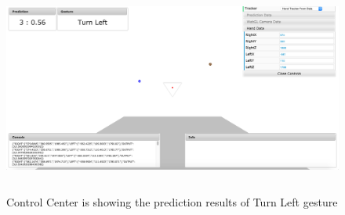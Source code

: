 \begin{figure}
	[h] \centering 
	\includegraphics[height=70mm]{figures/result/cc-turn-left.jpg} \caption{Control Center is showing the prediction results of Turn Left gesture}
	\label{res:cc:turn:left} 
\end{figure}
